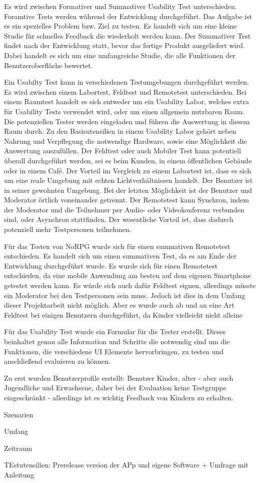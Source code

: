 		Es wird zwischen Formativer und Summativer Usability Test unterschieden. Foramtive Tests werden während der Entwicklung durchgeführt. Das Aufgabe ist es ein spezielles Problem bzw. Ziel zu testen. Es handelt sich um eine kleine Studie für schnelles Feedback die wiederholt werden kann. Der Summativer Test findet nach der Entwicklung statt, bevor das fertige Produkt ausgeliefert wird. Dabei handelt es sich um eine umfangreiche Studie, die alle Funktionen der Benutzeroberfläche bewertet.
		
		Ein Usabilty Test kann in verschiedenen Testumgebungen durchgeführt werden. Es wird zwischen einem Labortest, Feldtest und Remotetest unterschieden. Bei einem Raumtest handelt es sich entweder um ein Usability Labor, welches extra für Usability Tests verwendet wird, oder um einen allgemein nutzbaren Raum. Die potenziellen Tester werden eingeladen und führen die Auswertung in diesem Raum durch. Zu den Basisutensilien in einem Usability Labor gehört neben Nahrung und Verpflegung die notwendige Hardware, sowie eine Möglichkeit die Auswertung auszufüllen. Der Feldtest oder auch Mobiler Test kann potentiell überall durchgeführt werden, sei es beim Kunden, in einem öffentlichen Gebäude oder in einem Café. Der Vorteil im Vergleich zu einem Labortest ist, dass es sich um eine reale Umgebung mit echten Lichtverhältnissen handelt. Der Benutzer ist in seiner gewohnten Umgebung. Bei der letzten Möglichkeit ist der Benutzer und Moderator örtlich voneinander getrennt. Der Remotetest kann Synchron, indem der Moderator und die Teilnehmer per Audio- oder Videokonferenz verbunden sind, oder Asynchron stattfinden. Der wesentliche Vorteil ist, dass dadurch potenziell mehr Testpersonen teilnehmen.
		
		Für das Testen von NoRPG wurde sich für einen summativen Remotetest entschieden. Es handelt sich um einen summativen Test, da es am Ende der Entwicklung durchgeführt wurde. Es wurde sich für einen Remotetest entschieden, da eine mobile Anwendung am besten auf dem eigenen Smartphone getestet werden kann. Es würde sich auch dafür Feldtest eignen, allerdings müsste ein Moderator bei den Testpersonen sein muss. Jedoch ist dies in dem Umfang dieser Projektarbeit nicht möglich. Aber es wurde auch ab und an eine Art Feldtest bei einigen Benutzern durchgeführt, da Kinder vielleicht nicht alleine 
		
		Für das Usability Test wurde ein Formular für die Tester erstellt. Dieses beinhaltet genau alle Information und Schritte die notwendig sind um die Funktionen, die verschiedene UI Elemente hervorbringen, zu testen und anschließend evaluieren zu können.
	
		Zu erst wurden Benutzerprofile erstellt: Benutzer Kinder, alter - aber auch Jugendliche und Erwachsene, daher bei der Evaluation keine Testgruppe eingeschränkt - allerdings ist es wichtig Feedback von Kindern zu erhalten.
		
		Szenarien 
		
		Umfang 
		
		Zeitraum 
	
		TEstutensilien: Prerelease version der APp und eigene Software + Umfrage mit Anleitung
